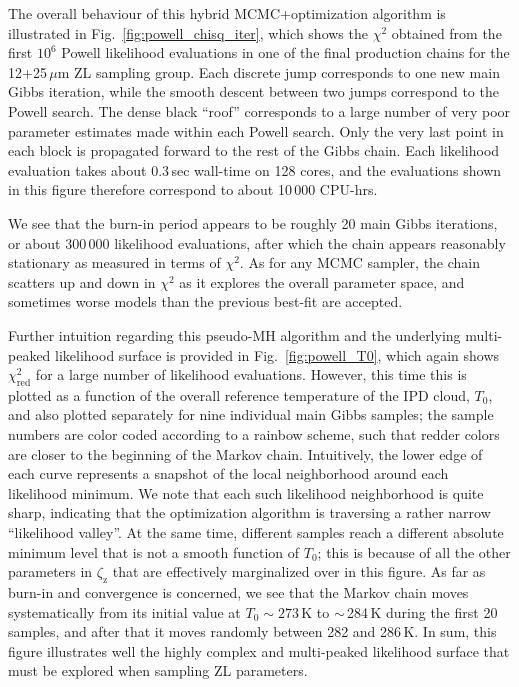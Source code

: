 \documentclass[twocolumn]{aa}
\begin{document}
The overall behaviour of this hybrid MCMC+optimization algorithm is
illustrated in Fig.~\ref{fig:powell_chisq_iter}, which shows the
$\chi^2$ obtained from the first $10^6$ Powell likelihood evaluations
in one of the final production chains for the 12+25\,$\mu$m ZL
sampling group. Each discrete jump corresponds to one new main Gibbs
iteration, while the smooth descent between two jumps correspond to
the Powell search. The dense black ``roof'' corresponds to a large
number of very poor parameter estimates made within each Powell
search. Only the very last point in each block is propagated forward
to the rest of the Gibbs chain. Each likelihood evaluation takes about
0.3\,sec wall-time on 128 cores, and the evaluations shown in this
figure therefore correspond to about 10\,000 CPU-hrs.

We see that the burn-in period appears to be roughly 20 main Gibbs
iterations, or about 300\,000 likelihood evaluations, after which the
chain appears reasonably stationary as measured in terms of
$\chi^2$. As for any MCMC sampler, the chain scatters up and down in
$\chi^2$ as it explores the overall parameter space, and sometimes
worse models than the previous best-fit are accepted.

Further intuition regarding this pseudo-MH algorithm and the
underlying multi-peaked likelihood surface is provided in
Fig.~\ref{fig:powell_T0}, which again shows $\chi^2_{\mathrm{red}}$
for a large number of likelihood evaluations. However, this time this
is plotted as a function of the overall reference temperature of the
IPD cloud, $T_0$, and also plotted separately for nine individual main
Gibbs samples; the sample numbers are color coded according to a
rainbow scheme, such that redder colors are closer to the beginning of
the Markov chain. Intuitively, the lower edge of each curve represents
a snapshot of the local neighborhood around each likelihood
minimum. We note that each such likelihood neighborhood is quite
sharp, indicating that the optimization algorithm is traversing a
rather narrow ``likelihood valley''. At the same time, different
samples reach a different absolute minimum level that is not a smooth
function of $T_0$; this is because of all the other parameters in
$\zeta_{\mathrm{z}}$ that are effectively marginalized over in this
figure. As far as burn-in and convergence is concerned, we see that
the Markov chain moves systematically from its initial value at
$T_0\sim273\,$K to $\sim$\,284\,K during the first 20 samples, and
after that it moves randomly between 282 and 286\,K. In sum, this
figure illustrates well the highly complex and multi-peaked likelihood
surface that must be explored when sampling ZL parameters.
\end{document}
